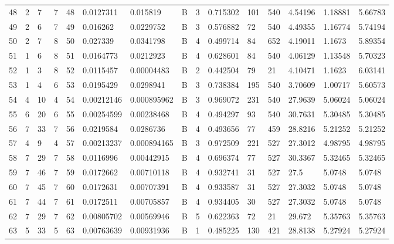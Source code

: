 \begin{latin}
\begin{longtable}{lllllllllllllll}
	48  & 2  & 7   & 7  & 48  & 0.0127311      & 0.015819       & B & 3  & 0.715302 & 101  & 540  & 4.54196 & 1.18881 & 5.66783 \\
	49  & 2  & 6   & 7  & 49  & 0.016262       & 0.0229752      & B & 3  & 0.576882 & 72   & 540  & 4.49355 & 1.16774 & 5.74194 \\
	50  & 2  & 7   & 8  & 50  & 0.027339       & 0.0341798      & B & 4  & 0.499714 & 84   & 652  & 4.19011 & 1.1673  & 5.89354 \\
	51  & 1  & 6   & 8  & 51  & 0.0164773      & 0.0212923      & B & 4  & 0.628601 & 84   & 540  & 4.06129 & 1.13548 & 5.70323 \\
	52  & 1  & 3   & 8  & 52  & 0.0115457      & 0.00004483     & B & 2  & 0.442504 & 79   & 21   & 4.10471 & 1.1623  & 6.03141 \\
	53  & 1  & 4   & 6  & 53  & 0.0195429      & 0.0298941      & B & 3  & 0.738384 & 195  & 540  & 3.70609 & 1.00717 & 5.60573 \\
	54  & 4  & 10  & 4  & 54  & 0.00212146     & 0.000895962    & B & 3  & 0.969072 & 231  & 540  & 27.9639 & 5.06024 & 5.06024 \\
	55  & 6  & 20  & 6  & 55  & 0.00254599     & 0.00238468     & B & 4  & 0.494297 & 93   & 540  & 30.7631 & 5.30485 & 5.30485 \\
	56  & 7  & 33  & 7  & 56  & 0.0219584      & 0.0286736      & B & 4  & 0.493656 & 77   & 459  & 28.8216 & 5.21252 & 5.21252 \\
	57  & 4  & 9   & 4  & 57  & 0.00213237     & 0.000894165    & B & 3  & 0.972509 & 221  & 527  & 27.3012 & 4.98795 & 4.98795 \\
	58  & 7  & 29  & 7  & 58  & 0.0116996      & 0.00442915     & B & 4  & 0.696374 & 77   & 527  & 30.3367 & 5.32465 & 5.32465 \\
	59  & 7  & 46  & 7  & 59  & 0.0172662      & 0.00710118     & B & 4  & 0.932741 & 31   & 527  & 27.5    & 5.0748  & 5.0748  \\
	60  & 7  & 45  & 7  & 60  & 0.0172631      & 0.00707391     & B & 4  & 0.933587 & 31   & 527  & 27.3032 & 5.0748  & 5.0748  \\
	61  & 7  & 44  & 7  & 61  & 0.0172511      & 0.00705857     & B & 4  & 0.934405 & 30   & 527  & 27.3032 & 5.0748  & 5.0748  \\
	62  & 7  & 29  & 7  & 62  & 0.00805702     & 0.00569946     & B & 5  & 0.622363 & 72   & 21   & 29.672  & 5.35763 & 5.35763 \\
	63  & 5  & 33  & 5  & 63  & 0.00763639     & 0.00931936     & B & 1  & 0.485225 & 130  & 421  & 28.8138 & 5.27924 & 5.27924 \\

\end{longtable}
\end{latin}
